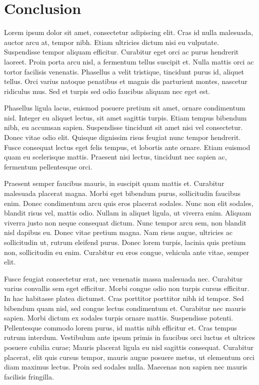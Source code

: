 \documentclass[
]{article}
\begin{document}
\clearpage

\section{Conclusion}\label{conclusion}

Lorem ipsum dolor sit amet, consectetur adipiscing elit. Cras id nulla malesuada, auctor arcu at, tempor nibh. Etiam ultricies dictum nisi eu vulputate. Suspendisse tempor aliquam efficitur. Curabitur eget orci ac purus hendrerit laoreet. Proin porta arcu nisl, a fermentum tellus suscipit et. Nulla mattis orci ac tortor facilisis venenatis. Phasellus a velit tristique, tincidunt purus id, aliquet tellus. Orci varius natoque penatibus et magnis dis parturient montes, nascetur ridiculus mus. Sed et turpis sed odio faucibus aliquam nec eget est.

Phasellus ligula lacus, euismod posuere pretium sit amet, ornare condimentum nisl. Integer eu aliquet lectus, sit amet sagittis turpis. Etiam tempus bibendum nibh, eu accumsan sapien. Suspendisse tincidunt sit amet nisi vel consectetur. Donec vitae odio elit. Quisque dignissim risus feugiat nunc tempor hendrerit. Fusce consequat lectus eget felis tempus, et lobortis ante ornare. Etiam euismod quam eu scelerisque mattis. Praesent nisi lectus, tincidunt nec sapien ac, fermentum pellentesque orci.

Praesent semper faucibus mauris, in suscipit quam mattis et. Curabitur malesuada placerat magna. Morbi eget bibendum purus, sollicitudin faucibus enim. Donec condimentum arcu quis eros placerat sodales. Nunc non elit sodales, blandit risus vel, mattis odio. Nullam in aliquet ligula, ut viverra enim. Aliquam viverra justo non neque consequat dictum. Nunc tempor arcu sem, non blandit nisl dapibus eu. Donec vitae pretium magna. Nam risus augue, ultricies ac sollicitudin ut, rutrum eleifend purus. Donec lorem turpis, lacinia quis pretium non, sollicitudin eu enim. Curabitur eu eros congue, vehicula ante vitae, semper elit.

Fusce feugiat consectetur erat, nec venenatis massa malesuada nec. Curabitur varius convallis sem eget efficitur. Morbi congue odio non turpis cursus efficitur. In hac habitasse platea dictumst. Cras porttitor porttitor nibh id tempor. Sed bibendum quam nisl, sed congue lectus condimentum et. Curabitur nec mauris sapien. Morbi dictum ex sodales turpis ornare mattis. Suspendisse potenti. Pellentesque commodo lorem purus, id mattis nibh efficitur et. Cras tempus rutrum interdum. Vestibulum ante ipsum primis in faucibus orci luctus et ultrices posuere cubilia curae; Mauris placerat ligula eu nisl sagittis consequat. Curabitur placerat, elit quis cursus tempor, mauris augue posuere metus, ut elementum orci diam maximus lectus. Proin sed sodales nulla. Maecenas non sapien nec mauris facilisis fringilla.
\end{document}

